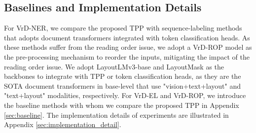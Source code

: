 \documentclass[11pt]{article}
\begin{document}
\subsection{Baselines and Implementation Details}

For VrD-NER, we compare the proposed TPP with sequence-labeling methods that adopts document transformers integrated with token classification heads. 
As these methods suffer from the reading order issue, we adopt a VrD-ROP model as the pre-processing mechanism to reorder the inputs, mitigating the impact of the reading order issue.  
We adopt LayoutLMv3-base \citep{huang2022layoutlmv3} and LayoutMask \citep{tu2023layoutmask} as the backbones to integrate with TPP or token classification heads, as they are the SOTA document transformers in base-level that use "vision+text+layout" and "text+layout" modalities, respectively. 
For VrD-EL and VrD-ROP, we introduce the baseline methods with whom we compare the proposed TPP in Appendix \ref{sec:baseline}. 
The implementation details of experiments are illustrated in Appendix \ref{sec:implementation_detail}. 
\end{document}
